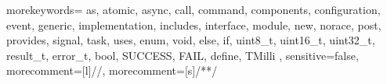 {
    morekeywords=
    {
        as, atomic, async, call,
        command, components, configuration, event, generic,
        implementation, includes, interface, module, new, norace, post,
        provides, signal, task, uses, enum, void, else, if, uint8_t,
        uint16_t, uint32_t, result_t, error_t, bool, SUCCESS, FAIL,
        define, TMilli
    },
    sensitive=false,
    morecomment=[l]{//},
    morecomment=[s]{/*}{*/}
}
